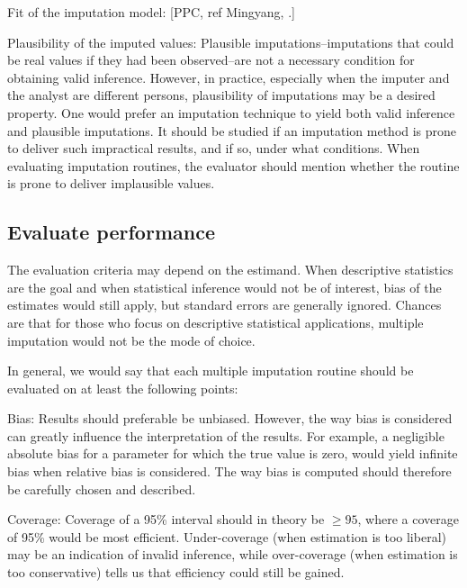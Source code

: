 \documentclass[bimj,fleqn]{w-art}
\theoremstyle{plain}
\theoremstyle{definition}
\begin{document}
Fit of the imputation model: [PPC, ref Mingyang, \citep{nguy17, zhao22}.]

Plausibility of the imputed values: Plausible imputations--imputations that could be real values if they had been observed--are not a necessary condition for obtaining valid inference. However, in practice, especially when the imputer and the analyst are different persons, plausibility of imputations may be a desired property. One would prefer an imputation technique to yield both valid inference and plausible imputations. It should be studied if an imputation method is prone to deliver such impractical results, and if so, under what conditions. When evaluating imputation routines, the evaluator should mention whether the routine is prone to deliver implausible values. 


\subsection{Evaluate performance}


The evaluation criteria may depend on the estimand. When descriptive statistics are the goal and when statistical inference would not be of interest, bias of the estimates would still apply, but standard errors are generally ignored. Chances are that for those who focus on descriptive statistical applications, multiple imputation would not be the mode of choice. 

In general, we would say that each multiple imputation routine should be evaluated on at least the following points:

Bias: Results should preferable be unbiased. However, the way bias is considered can greatly influence the interpretation of the results. For example, a negligible absolute bias for a parameter for which the true value is zero, would yield infinite bias when relative bias is considered. The way bias is computed should therefore be carefully chosen and described. 

Coverage: Coverage of a 95\% interval should in theory be $\geq 95$, where a coverage of 95\% would be most efficient. Under-coverage (when estimation is too liberal) may be an indication of invalid inference, while over-coverage (when estimation is too conservative) tells us that efficiency could still be gained. 
\end{document}
